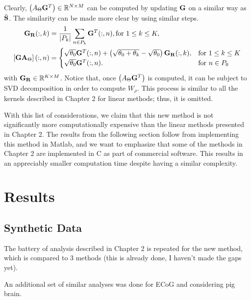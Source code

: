 Clearly, $\left( A_\Theta \mathbf{G}^T \right)\in \mathbb{R}^{N\times M}$ can be computed by updating $\mathbf{G}$ on a similar way as $\hat{\mathbf{S}}$.
%
The similarity can be made more clear by using similar steps.
\begin{align}
    \mathbf{G}_{\mathbf{R}}(:,k) 
    &= 
    \frac{1}{\left| {P_k} \right|} \sum_{n \in P_k} \mathbf{G}^T(:, n), 
    \text{for } 1\leq k \leq K,
    \\
    \left[ \mathbf{G} \mathbf{A}_\Theta \right](:, n) 
    &=
    \begin{cases}
    \sqrt{\theta_0} \mathbf{G}^T(:,n) 
     + \left( \sqrt{\theta_0+\theta_k}-\sqrt{\theta_0} \right) \mathbf{G}_{\mathbf{R}}(:,k), &\text{for } 1\leq k \leq K \\
    \sqrt{\theta_0} \mathbf{G}^T(:,n).
    &\text{for } n\in P_0
    \end{cases}
\end{align}
with $\mathbf{G}_{\mathbf{R}} \in \mathbb{R}^{K\times M}$.
%
Notice that, once $\left( A_\Theta \mathbf{G}^T \right)$ is computed, it can be subject to 
SVD decomposition in order to compute $W_\rho$.
%
This process is similar to all the kernels described in Chapter 2 for linear methods; thus, it is omitted.

With this list of considerations, we claim that this new method is not significantly more computationally expensive than the linear methods presented in Chapter 2.
%
The results from the following section follow from implementing this method in Matlab, and we want to emphasize that some of the methods in Chapter 2 are implemented in C as part of commercial software.
%
This results in an appreciably smaller computation time despite having a similar complexity.





\section{Results}

\subsection{Synthetic Data}

The battery of analysis described in Chapter 2 is repeated for the new method, which is compared to 3 methods (this is already done, I haven't made the gaps yet).

An additional set of similar analyses was done for ECoG and considering pig brain.

